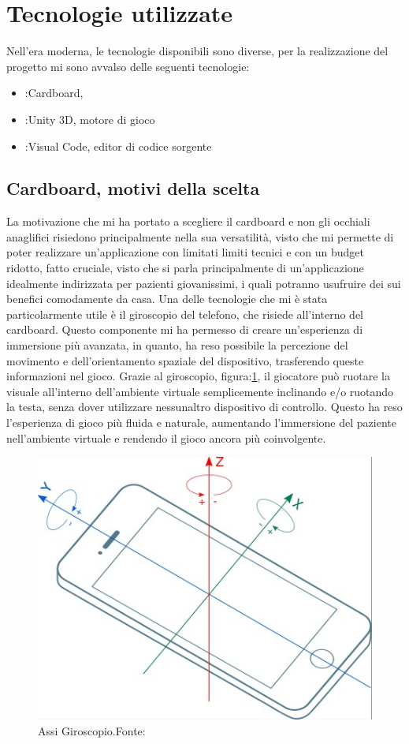 \documentclass[
a4paper,
cleardoublepage=empty,
headings=twolinechapter,
numbers=autoenddot,
]{scrbook}
\begin{document}
	\section{Tecnologie utilizzate}
	Nell'era moderna, le tecnologie disponibili sono diverse, per la realizzazione del progetto mi sono avvalso delle seguenti tecnologie:
	\begin{itemize}
		\item:Cardboard, 
		\item:Unity 3D, motore di gioco
		\item:Visual Code, editor di codice sorgente
	\end{itemize}
	\subsection{Cardboard, motivi della scelta}\label{chap:cardboard_motivi}
	La motivazione che mi ha portato a scegliere il cardboard e non gli occhiali anaglifici risiedono principalmente nella sua versatilità, visto che mi permette di poter realizzare un'applicazione con limitati limiti tecnici e con un budget ridotto, fatto cruciale, visto che si parla principalmente di un'applicazione idealmente indirizzata per pazienti giovanissimi, i quali potranno usufruire dei sui benefici comodamente da casa.
	Una delle tecnologie che mi è stata particolarmente utile è il giroscopio del telefono, che risiede all'interno del cardboard. Questo componente mi ha permesso di creare un'esperienza di immersione più avanzata, in quanto, ha reso possibile la percezione del movimento e dell'orientamento spaziale del dispositivo, trasferendo queste informazioni nel gioco. Grazie al giroscopio, figura:\ref{fig:giroscopio}, il giocatore può ruotare la visuale all'interno dell'ambiente virtuale semplicemente inclinando e/o ruotando la testa, senza dover utilizzare nessunaltro dispositivo di controllo. Questo ha reso l'esperienza di gioco più fluida e naturale, aumentando l'immersione del paziente nell'ambiente virtuale e rendendo il gioco ancora più coinvolgente.
	\begin{figure}[H]
		\centering
		\includegraphics[width=0.5\linewidth]{image/giroscopio}
		\caption{Assi Giroscopio.Fonte:\cite{Giro_image}}
		\label{fig:giroscopio}
	\end{figure}
\end{document}
